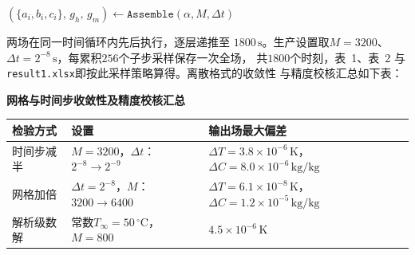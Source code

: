 \documentclass[withoutpreface,bwprint]{cumcmthesis} %
\begin{document}
\begin{algorithm}[htbp]
\small
\caption{问题一：全隐式有限体积时间推进（追赶法）}
\label{alg:q1solve}
$(\{a_i,b_i,c_i\},\,g_h,\,g_m)\leftarrow\texttt{Assemble}(\alpha,M,\Delta t)$
\end{algorithm}

两场在同一时间循环内先后执行，逐层递推至 $1800\,\mathrm{s}$。生产设置取$M=3200$、
$\Delta t=2^{-8}\,\mathrm{s}$，每累积$256$个子步采样保存一次全场，
共$1800$个时刻，表~1、表~2 与\texttt{result1.xlsx}即按此采样策略算得。离散格式的收敛性
与精度校核汇总如下表：

\begin{table}[htbp]
\centering
\begin{minipage}{0.94\textwidth}
\centering\small
\textbf{网格与时间步收敛性及精度校核汇总}\\[3pt]
\begin{tabular}{p{}p{}p{}}
\toprule
检验方式 & 设置 & 输出场最大偏差 \\
\midrule
时间步减半 & $M=3200$，$\Delta t$：$2^{-8}\to2^{-9}$ & $\Delta T=3.8\times10^{-6}\,\mathrm{K}$，$\Delta C=8.0\times10^{-6}\,\mathrm{kg/kg}$ \\
网格加倍 & $\Delta t=2^{-8}$，$M$：$3200\to6400$ & $\Delta T=6.1\times10^{-8}\,\mathrm{K}$，$\Delta C=1.2\times10^{-5}\,\mathrm{kg/kg}$ \\
解析级数解 & 常数$T_\infty=50\,^\circ\mathrm{C}$，$M=800$ & $4.5\times10^{-6}\,\mathrm{K}$ \\
\bottomrule
\end{tabular}
\end{minipage}
\end{table}
\end{document}
